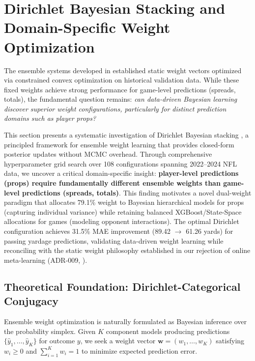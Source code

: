 \section{Dirichlet Bayesian Stacking and Domain-Specific Weight Optimization}
\label{sec:dirichlet-stacking}

The ensemble systems developed in  established static weight vectors optimized via constrained convex optimization on historical validation data. While these fixed weights achieve strong performance for game-level predictions (spreads, totals), the fundamental question remains: \emph{can data-driven Bayesian learning discover superior weight configurations, particularly for distinct prediction domains such as player props?}

This section presents a systematic investigation of Dirichlet Bayesian stacking \citep{yao2018}, a principled framework for ensemble weight learning that provides closed-form posterior updates without MCMC overhead. Through comprehensive hyperparameter grid search over 108 configurations spanning 2022--2024 NFL data, we uncover a critical domain-specific insight: \textbf{player-level predictions (props) require fundamentally different ensemble weights than game-level predictions (spreads, totals)}. This finding motivates a novel dual-weight paradigm that allocates 79.1\% weight to Bayesian hierarchical models for props (capturing individual variance) while retaining balanced XGBoost/State-Space allocations for games (modeling opponent interactions). The optimal Dirichlet configuration achieves 31.5\% MAE improvement (89.42 $\to$ 61.26 yards) for passing yardage predictions, validating data-driven weight learning while reconciling with the static weight philosophy established in our rejection of online meta-learning (ADR-009, ).

\subsection{Theoretical Foundation: Dirichlet-Categorical Conjugacy}
\label{subsec:dirichlet-theory}

Ensemble weight optimization is naturally formulated as Bayesian inference over the probability simplex. Given $K$ component models producing predictions $\{\hat{y}_1, \ldots, \hat{y}_K\}$ for outcome $y$, we seek a weight vector $\mathbf{w} = (w_1, \ldots, w_K)$ satisfying $w_i \geq 0$ and $\sum_{i=1}^K w_i = 1$ to minimize expected prediction error.

